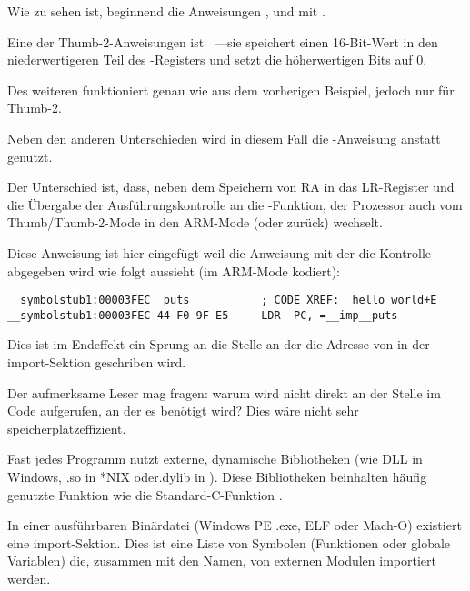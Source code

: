 
Wie zu sehen ist, beginnend die Anweisungen ,  und  mit .

Eine der Thumb-2-Anweisungen ist  ~---sie speichert einen 16-Bit-Wert in den
niederwertigeren Teil des -Registers und setzt die höherwertigen Bits auf 0.

Des weiteren funktioniert  genau wie  aus dem vorherigen Beispiel,
jedoch nur für Thumb-2.


Neben den anderen Unterschieden wird in diesem Fall die -Anweisung anstatt  genutzt.

Der Unterschied ist, dass, neben dem Speichern von \ac{RA} in das \ac{LR}-Register und die Übergabe
der Ausführungskontrolle an die \puts-Funktion, der Prozessor auch vom Thumb/Thumb-2-Mode in den
ARM-Mode (oder zurück) wechselt.

Diese Anweisung ist hier eingefügt weil die Anweisung mit der die Kontrolle abgegeben wird wie folgt
aussieht (im ARM-Mode kodiert):

\begin{lstlisting}[style=customasm]
__symbolstub1:00003FEC _puts           ; CODE XREF: _hello_world+E
__symbolstub1:00003FEC 44 F0 9F E5     LDR  PC, =__imp__puts
\end{lstlisting}

Dies ist im Endeffekt ein Sprung an die Stelle an der die Adresse von \puts in der import-Sektion geschriben wird.

Der aufmerksame Leser mag fragen: warum wird \puts nicht direkt an der Stelle im Code aufgerufen,
an der es benötigt wird? Dies wäre nicht sehr speicherplatzeffizient.

Fast jedes Programm nutzt externe, dynamische Bibliotheken (wie DLL in Windows, .so in *NIX oder.dylib in \MacOSX).
Diese Bibliotheken beinhalten häufig genutzte Funktion wie die Standard-C-Funktion \puts.

In einer ausführbaren Binärdatei (Windows PE .exe, ELF oder Mach-O) existiert eine import-Sektion.
Dies ist eine Liste von Symbolen (Funktionen oder globale Variablen) die, zusammen mit den Namen, von
externen Modulen importiert werden.

